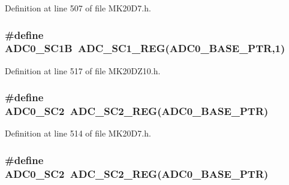 Definition at line 507 of file M\+K20\+D7.\+h.

\subsubsection[{\texorpdfstring{A\+D\+C0\+\_\+\+S\+C1B}{ADC0_SC1B}}]{\setlength{\rightskip}{0pt plus 5cm}\#define A\+D\+C0\+\_\+\+S\+C1B~{\bf A\+D\+C\+\_\+\+S\+C1\+\_\+\+R\+EG}({\bf A\+D\+C0\+\_\+\+B\+A\+S\+E\+\_\+\+P\+TR},1)}\hypertarget{group___a_d_c___register___accessor___macros_ga9a83b6b66f4db147b1c3f952e62b57d5}{}\label{group___a_d_c___register___accessor___macros_ga9a83b6b66f4db147b1c3f952e62b57d5}


Definition at line 517 of file M\+K20\+D\+Z10.\+h.

\subsubsection[{\texorpdfstring{A\+D\+C0\+\_\+\+S\+C2}{ADC0_SC2}}]{\setlength{\rightskip}{0pt plus 5cm}\#define A\+D\+C0\+\_\+\+S\+C2~{\bf A\+D\+C\+\_\+\+S\+C2\+\_\+\+R\+EG}({\bf A\+D\+C0\+\_\+\+B\+A\+S\+E\+\_\+\+P\+TR})}\hypertarget{group___a_d_c___register___accessor___macros_gaecf9cc86d430a0b004e90ad7baec3fd2}{}\label{group___a_d_c___register___accessor___macros_gaecf9cc86d430a0b004e90ad7baec3fd2}


Definition at line 514 of file M\+K20\+D7.\+h.

\subsubsection[{\texorpdfstring{A\+D\+C0\+\_\+\+S\+C2}{ADC0_SC2}}]{\setlength{\rightskip}{0pt plus 5cm}\#define A\+D\+C0\+\_\+\+S\+C2~{\bf A\+D\+C\+\_\+\+S\+C2\+\_\+\+R\+EG}({\bf A\+D\+C0\+\_\+\+B\+A\+S\+E\+\_\+\+P\+TR})}\hypertarget{group___a_d_c___register___accessor___macros_gaecf9cc86d430a0b004e90ad7baec3fd2}{}\label{group___a_d_c___register___accessor___macros_gaecf9cc86d430a0b004e90ad7baec3fd2}


